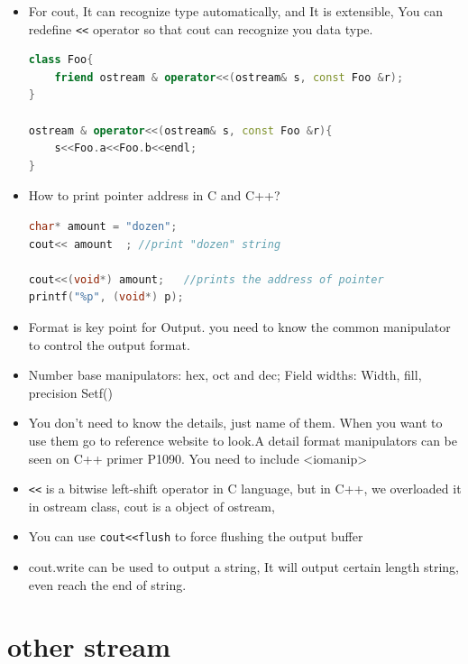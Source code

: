 \documentclass[a4paper,12pt,twoside]{book}
\begin{document}
\begin{itemize}
	\item For cout, It can recognize type automatically, and It is extensible, You can redefine \verb=<<= operator so that cout can recognize you data type.
\begin{lstlisting}[frame=single, language=c++]
class Foo{
	friend ostream & operator<<(ostream& s, const Foo &r);
}
	
ostream & operator<<(ostream& s, const Foo &r){
	s<<Foo.a<<Foo.b<<endl;
}
\end{lstlisting}
	
	\item  How to print pointer address in C and C++?
\begin{lstlisting}[frame=single, language=c++]
char* amount = "dozen";
cout<< amount  ; //print "dozen" string
	
cout<<(void*) amount;   //prints the address of pointer
printf("%p", (void*) p);
\end{lstlisting}
	
	
	\item Format is key point for Output. you need to know the common manipulator to control the output format.
	\item Number base manipulators:  hex, oct  and dec; Field widths: Width,  fill, precision Setf()
	\item You don't need to know the details, just name of them. When you want to use them go to reference website to look.A detail format manipulators can be seen on C++ primer P1090. You need to include <iomanip>
	
	\item \verb=<<= is a bitwise left-shift operator in C language, but in C++, we overloaded it in ostream class, cout is a object of ostream,
	
	\item You can use \verb=cout<<flush= to force flushing the output buffer
	\item cout.write can be used to output a string, It will output certain length string, even reach the end of string.
	
	
\end{itemize}

\section{other stream}
\end{document}
